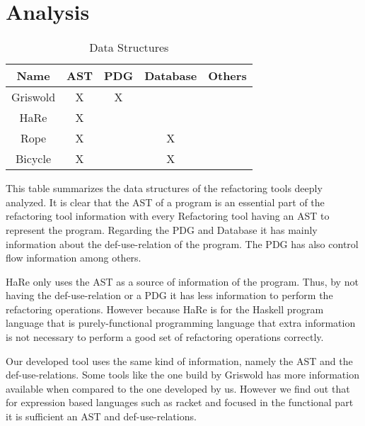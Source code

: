 \section{Analysis}
\begin{table}[]
\centering
\caption{Data Structures}
\label{my-label}
\begin{tabular}{c|c|c|c|c}
Name     & AST & PDG & Database & Others \\ \hline
Griswold & X   & X   &          &        \\ \hline
HaRe     & X   &     &          &        \\ \hline
Rope     & X   &     & X        &        \\ \hline
Bicycle  & X   &     & X        &
\end{tabular}
\end{table}
This table summarizes the data structures of the refactoring tools deeply analyzed.
It is clear that the AST of a program is an essential part of the refactoring
tool information with every Refactoring tool having an AST to represent the program.
Regarding the PDG and Database it has mainly information about the def-use-relation
of the program. The PDG has also control flow information among others.

HaRe only uses the AST as a source of information of the program. Thus, by not having
the def-use-relation or a PDG it has less information to perform the refactoring operations.
However because HaRe is for the Haskell program language that is purely-functional
programming language that extra information is not necessary to perform a good set of
refactoring operations correctly.

Our developed tool uses the same kind of information, namely the AST and the def-use-relations.
Some tools like the one build by Griswold has more information available when compared
to the one developed by us. However we find out that for expression based languages
such as racket and focused in the functional part it is sufficient an AST and
def-use-relations.





